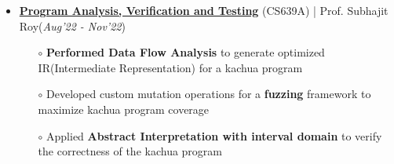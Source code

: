\documentclass[10.8pt, a4paper]{extarticle}
\begin{document}
\begin{itemize}
  \item \href{https://github.com/vamshimorlawar/CS639A} {\textbf{Program Analysis, Verification and Testing}} (CS639A) | Prof. Subhajit Roy\hfill\hfill(\textit{Aug'22 - Nov'22})
  \begin{itemize}
    \item[$\circ$] \textbf{Performed Data Flow Analysis} to generate optimized IR(Intermediate Representation) for a kachua program \\[-0.6cm]
    \item[$\circ$] Developed custom mutation operations for a \textbf{fuzzing} framework to maximize kachua program coverage \\[-0.6cm]
    \item[$\circ$] Applied \textbf{Abstract Interpretation with interval domain} to verify the correctness of the kachua program \\[-0.6cm]
	\end{itemize}
  \vspace{0.055cm}
\end{itemize}
\end{document}
